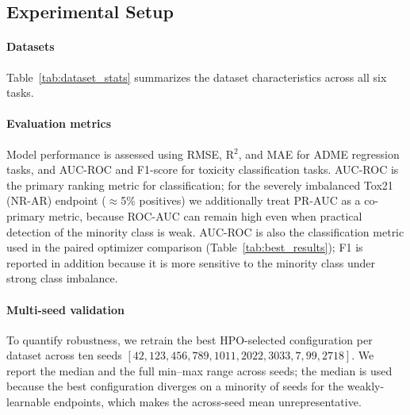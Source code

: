 \documentclass[journal]{IEEEtran}
\begin{document}
\subsection{Experimental Setup}
\label{sec:experimental_setup}

\paragraph{Datasets}
Table~\ref{tab:dataset_stats} summarizes the dataset characteristics across all six tasks.

\paragraph{Evaluation metrics}
Model performance is assessed using RMSE, R$^2$, and MAE for ADME regression tasks, and AUC-ROC and F1-score for toxicity classification tasks. AUC-ROC is the primary ranking metric for classification; for the severely imbalanced Tox21 (NR-AR) endpoint ($\approx$5\% positives) we additionally treat PR-AUC as a co-primary metric, because ROC-AUC can remain high even when practical detection of the minority class is weak. AUC-ROC is also the classification metric used in the paired optimizer comparison (Table~\ref{tab:best_results}); F1 is reported in addition because it is more sensitive to the minority class under strong class imbalance.

\paragraph{Multi-seed validation}
To quantify robustness, we retrain the best HPO-selected configuration per dataset across ten seeds $[42, 123, 456, 789, 1011, 2022, 3033, 7, 99, 2718]$. We report the median and the full min--max range across seeds; the median is used because the best configuration diverges on a minority of seeds for the weakly-learnable endpoints, which makes the across-seed mean unrepresentative.
\end{document}
